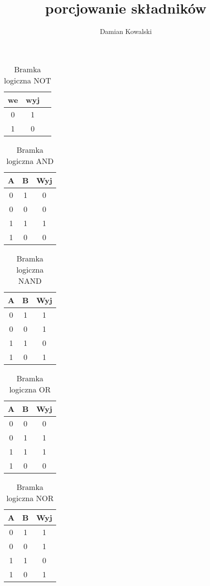 \documentclass[12pt, letterpaper, titlepage]{article}
\title{porcjowanie składników}
\author{Damian Kowalski}
\begin{document}
\maketitle

\newpage

\begin{table}[h]
\centering\caption{Bramka logiczna NOT}

\begin {tabular}{|c|c|c|}
\hline 
we & wyj\\
\hline
0 & 1\\
\hline
1 & 0\\
\hline
\end{tabular}
\end{table}


\begin{table}[h]
\centering\caption{Bramka logiczna AND}
\begin {tabular}{|c|c|c|}
\hline
A & B & Wyj\\
\hline
0 & 1 & 0\\
\hline
0 & 0 & 0\\
\hline
1 & 1 & 1\\
\hline
1 & 0 & 0\\
\hline
\end{tabular}
\end{table}

\begin{table}[h]
\centering\caption{Bramka logiczna NAND}
\begin {tabular}{|c|c|c|}
\hline
A & B & Wyj\\
\hline
0 & 1 & 1\\
\hline
0 & 0 & 1\\
\hline
1 & 1 & 0\\
\hline
1 & 0 & 1\\
\hline
\end{tabular}
\end{table}

\begin{table}[h]
\centering\caption{Bramka logiczna OR}
\begin {tabular}{|c|c|c|}
\hline
A & B & Wyj\\
\hline
0 & 0 & 0\\
\hline
0 & 1 &	1\\
\hline
1 & 1 & 1\\
\hline
1 & 0 & 0\\
\hline
\end{tabular}
\end{table}

\begin{table}[h]
\centering\caption{Bramka logiczna NOR}
\begin {tabular}{|c|c|c|}
\hline
A & B & Wyj\\
\hline
0 & 1 & 1\\
\hline
0 & 0 & 1\\
\hline
1 & 1 & 0\\
\hline
1 & 0 & 1\\
\hline
\end{tabular}
\end{table}
\end{document}
